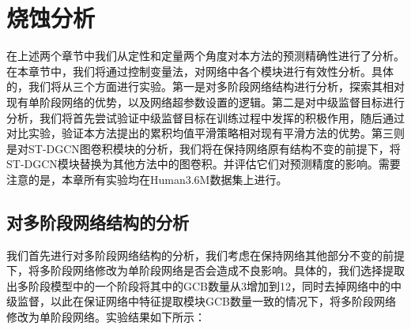 \clearpage

\section{烧蚀分析}
在上述两个章节中我们从定性和定量两个角度对本方法的预测精确性进行了分析。在本章节中，我们将通过控制变量法，对网络中各个模块进行有效性分析。具体的，我们将从三个方面进行实验。第一是对多阶段网络结构进行分析，探索其相对现有单阶段网络的优势，以及网络超参数设置的逻辑。第二是对中级监督目标进行分析，我们将首先尝试验证中级监督目标在训练过程中发挥的积极作用，随后通过对比实验，验证本方法提出的累积均值平滑策略相对现有平滑方法的优势。第三则是对ST-DGCN图卷积模块的分析，我们将在保持网络原有结构不变的前提下，将ST-DGCN模块替换为其他方法中的图卷积。并评估它们对预测精度的影响。需要注意的是，本章所有实验均在Human3.6M数据集上进行。
\subsection{对多阶段网络结构的分析}
我们首先进行对多阶段网络结构的分析，我们考虑在保持网络其他部分不变的前提下，将多阶段网络修改为单阶段网络是否会造成不良影响。具体的，我们选择提取出多阶段模型中的一个阶段将其中的GCB数量从3增加到12，同时去掉网络中的中级监督，以此在保证网络中特征提取模块GCB数量一致的情况下，将多阶段网络修改为单阶段网络。实验结果如下所示：

\begin{table}[h]
    \begin{center}
    \end{center}
    \caption{单阶段网络与多阶段网络对比}
    \label{table:ablation_1}
    \end{table}


